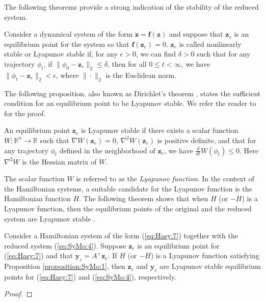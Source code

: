 {\edit 
The following theorems provide a strong indication of the stability of the reduced system. 

\begin{definition} \label{definition:SyMo:1} \cite{bhatia2002stability}
Consider a dynamical system of the form $\dot{\mathbf z} = \mathbf f(\mathbf z)$ and suppose that $\mathbf z_e$ is an equilibrium point for the system so that $\mathbf f(\mathbf z_e) = 0$. $\mathbf z_e$ is called nonlinearly stable or Lyapunov stable if, for any $\epsilon > 0$, we can find $\delta > 0$ such that for any trajectory $\phi_t$, if $\| \phi_0 - \mathbf z_e \|_2 \leq \delta$, then for all $0 \leq t < \infty$, we have $\| \phi_t - \mathbf z_e \|_2 < \epsilon$, where $\| \cdot \|_2$ is the Euclidean norm.
\end{definition}	
The following proposition, also known as Dirichlet's theorem \cite{bhatia2002stability}, states the sufficient condition for an equilibrium point to be Lyapunov stable. We refer the reader to \cite{bhatia2002stability} for the proof.
\begin{proposition} \label{proposition:SyMo:1} \cite{bhatia2002stability}
An equilibrium point $\mathbf z_e$ is Lyapunov stable if there exists a scalar function $W : \mathbb R^{n} \to  \mathbb R$ such that $\nabla W(\mathbf z_e) = 0$, $\nabla^2 W(\mathbf z_e)$ is positive definite, and that for any trajectory $\phi_t$ defined in the neighborhood of $\mathbf z_e$, we have $\frac{d}{dt} W(\phi_t) \leq 0$. Here $\nabla^2W$ is the Hessian matrix of $W$.
\end{proposition}
The scalar function $W$ is referred to as the \emph{Lyapunov function}. In the context of the Hamiltonian systems, a suitable candidate for the Lyapunov function is the Hamiltonian function $H$. The following theorem shows that when $H$ (or $-H$) is a Lyapunov function, then the equilibrium points of the original and the reduced system are Lyapunov stable \cite{abraham1978foundations}. 
\begin{theorem} \label{theorem:SyMo:1}
Consider a Hamiltonian system of the form (\ref{eq:Hasy:7}) together with the reduced system (\ref{eq:SyMo:4}). Suppose $\mathbf z_e$ is an equilibrium point for (\ref{eq:Hasy:7}) and that $\mathbf y_e = A^+\mathbf z_e$. If $H$ (or $-H$) is a Lyapunov function satisfying Proposition \ref{proposition:SyMo:1}, then $\mathbf z_e$ and $\mathbf y_e$ are Lyapunov stable equilibrium points for (\ref{eq:Hasy:7}) and (\ref{eq:SyMo:4}), respectively. 
\end{theorem}
\begin{proof}

\end{proof}}
